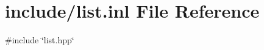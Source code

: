 \hypertarget{list_8inl}{}\section{include/list.inl File Reference}
\label{list_8inl}
{\ttfamily \#include \char`\"{}list.\+hpp\char`\"{}}\newline
